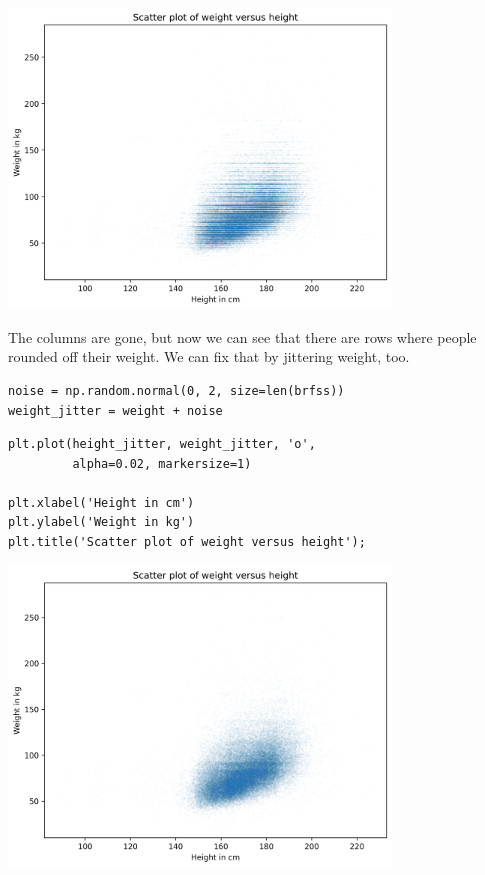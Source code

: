 \begin{center}
\includegraphics[width=4in]{chapters/09_relationships_files/09_relationships_20_0.png}
\end{center}

The columns are gone, but now we can see that there are rows where
people rounded off their weight. We can fix that by jittering weight,
too.

\begin{lstlisting}[]
noise = np.random.normal(0, 2, size=len(brfss))
weight_jitter = weight + noise
\end{lstlisting}

\begin{lstlisting}[]
plt.plot(height_jitter, weight_jitter, 'o', 
         alpha=0.02, markersize=1)

plt.xlabel('Height in cm')
plt.ylabel('Weight in kg')
plt.title('Scatter plot of weight versus height');
\end{lstlisting}

\begin{center}
\includegraphics[width=4in]{chapters/09_relationships_files/09_relationships_23_0.png}
\end{center}

